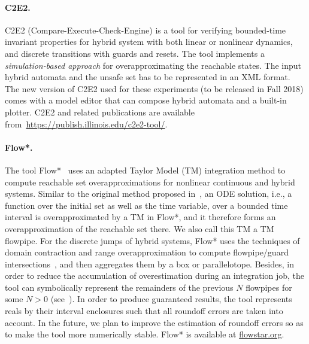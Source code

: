 \documentclass[EPiC]{easychair}
\begin{document}
\paragraph{C2E2.}
C2E2 (Compare-Execute-Check-Engine) \cite{c2e2_2,c2e2_1} is a tool for verifying bounded-time invariant properties for hybrid system with both linear or nonlinear dynamics,
and discrete transitions with guards and resets. The tool implements a \textit{simulation-based approach} for overapproximating the reachable states. The input hybrid automata and the unsafe set has to be represented in an XML format. The new version of C2E2 used for these experiments (to be released in Fall 2018) comes with a model editor that can compose hybrid automata and a built-in plotter. C2E2 and related publications are available from~\url{https://publish.illinois.edu/c2e2-tool/}.

\paragraph{Flow*.} The tool Flow*~\cite{Chen+/2013/flowstar} uses an adapted Taylor Model (TM) integration method to compute reachable set overapproximations for nonlinear continuous and hybrid systems. Similar to the original method proposed in~\cite{Berz+Makino/1998/Verified}, an ODE solution, i.e., a function over the initial set as well as the time variable, over a bounded time interval is overapproximated by a TM in Flow*, and it therefore forms an overapproximation of the reachable set there. We also call this TM a TM flowpipe. For the discrete jumps of hybrid systems, Flow* uses the techniques of domain contraction and range overapproximation to compute flowpipe/guard intersections~\cite{Chen+/2012/taylor_models}, and then aggregates them by a box or parallelotope. Besides, in order to reduce the accumulation of overestimation during an integration job, the tool can symbolically represent the remainders of the previous $N$ flowpipes for some $N > 0$ (see~\cite{Chen+Sankaranarayanan/2016/decomposed}). In order to produce guaranteed results, the tool represents reals by their interval enclosures such that all roundoff errors are taken into account. In the future, we plan to improve the estimation of roundoff errors so as to make the tool more numerically stable. Flow* is available at \url{flowstar.org}.
\end{document}
